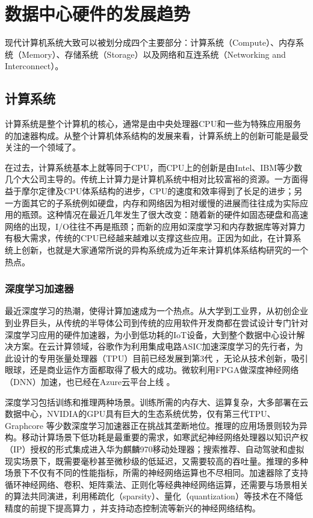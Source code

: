 \iffalse
\section{数据中心硬件的发展趋势}
\label{background:sec:hardware}



现代计算机系统大致可以被划分成四个主要部分：计算系统（Compute）、内存系统（Memory）、存储系统（Storage）以及网络和互连系统（Networking and Interconnect）。


\subsection{计算系统}

计算系统是整个计算机的核心，通常是由中央处理器CPU和一些为特殊应用服务的加速器构成。从整个计算机体系结构的发展来看，计算系统上的创新可能是最受关注的一个领域了。

在过去，计算系统基本上就等同于CPU，而CPU上的创新是由Intel、IBM等少数几个大公司主导的。传统上计算力是计算机系统中相对比较富裕的资源。一方面得益于摩尔定律及CPU体系结构的进步，CPU的速度和效率得到了长足的进步；另一方面其它的子系统例如硬盘，内存和网络因为相对缓慢的进展而往往成为实际应用的瓶颈。这种情况在最近几年发生了很大改变：随着新的硬件如固态硬盘和高速网络的出现，I/O往往不再是瓶颈；而新的应用如深度学习和内存数据库等对算力有极大需求，传统的CPU已经越来越难以支撑这些应用。正因为如此，在计算系统上创新，也就是大家通常所说的异构系统成为近年来计算机体系结构研究的一个热点。

\subsubsection{深度学习加速器}

最近深度学习的热潮，使得计算加速成为一个热点。从大学到工业界，从初创企业到业界巨头，从传统的半导体公司到传统的应用软件开发商都在尝试设计专门针对深度学习应用的硬件加速器，为小到低功耗的IoT设备，大到整个数据中心设计解决方案。在云计算领域，谷歌作为利用集成电路ASIC加速深度学习的先行者，为此设计的专用张量处理器（TPU）目前已经发展到第3代 \cite{tpu}，无论从技术创新，吸引眼球，还是商业运作方面都取得了极大的成功。微软利用FPGA做深度神经网络（DNN）加速，也已经在Azure云平台上线 \cite{serving-dnns-real-time-datacenter-scale-project-brainwave,a-configurable-cloud-scale-dnn-processor-for-real-time-ai}。

深度学习包括训练和推理两种场景。训练所需的内存大、运算复杂，大多部署在云数据中心，NVIDIA的GPU具有巨大的生态系统优势，仅有第三代TPU、Graphcore \cite{graphcore} 等少数深度学习加速器正在挑战其垄断地位。推理的应用场景则较为异构。移动计算场景下低功耗是最重要的需求，如寒武纪神经网络处理器以知识产权（IP）授权的形式集成进入华为麒麟970移动处理器；搜索推荐、自动驾驶和虚拟现实场景下，既需要毫秒甚至微秒级的低延迟，又需要较高的吞吐量。推理的多种场景下不仅有不同的性能指标，所需的神经网络运算也不尽相同。加速器除了支持循环神经网络、卷积、矩阵乘法、正则化等经典神经网络运算，还需要与场景相关的算法共同演进，利用稀疏化（sparsity）\cite{yao2018balanced,cao2019efficient}、量化（quantization）等技术在不降低精度的前提下提高算力 \cite{zhang2015optimizing}，并支持动态控制流等新兴的神经网络结构。

